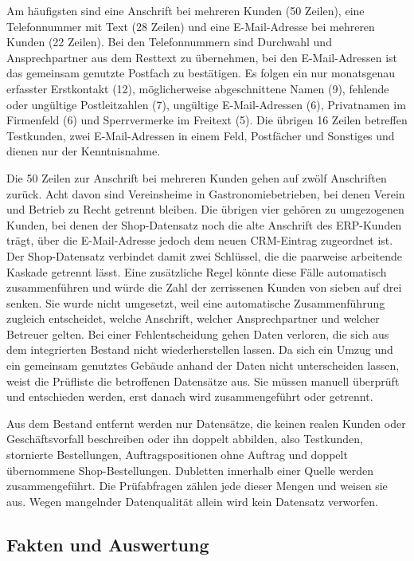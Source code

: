 \documentclass[a4paper,12pt]{article}
\begin{document}
Am häufigsten sind eine Anschrift bei mehreren Kunden (50 Zeilen), eine Telefonnummer mit Text (28 Zeilen) und eine E-Mail-Adresse bei mehreren Kunden (22 Zeilen). Bei den Telefonnummern sind Durchwahl und Ansprechpartner aus dem Resttext zu übernehmen, bei den E-Mail-Adressen ist das gemeinsam genutzte Postfach zu bestätigen. Es folgen ein nur monatsgenau erfasster Erstkontakt (12), möglicherweise abgeschnittene Namen (9), fehlende oder ungültige Postleitzahlen (7), ungültige E-Mail-Adressen (6), Privatnamen im Firmenfeld (6) und Sperrvermerke im Freitext (5). Die übrigen 16 Zeilen betreffen Testkunden, zwei E-Mail-Adressen in einem Feld, Postfächer und Sonstiges und dienen nur der Kenntnisnahme.

Die 50 Zeilen zur Anschrift bei mehreren Kunden gehen auf zwölf Anschriften zurück. Acht davon sind Vereinsheime in Gastronomiebetrieben, bei denen Verein und Betrieb zu Recht getrennt bleiben. Die übrigen vier gehören zu umgezogenen Kunden, bei denen der Shop-Datensatz noch die alte Anschrift des ERP-Kunden trägt, über die E-Mail-Adresse jedoch dem neuen CRM-Eintrag zugeordnet ist. Der Shop-Datensatz verbindet damit zwei Schlüssel, die die paarweise arbeitende Kaskade getrennt lässt. Eine zusätzliche Regel könnte diese Fälle automatisch zusammenführen und würde die Zahl der zerrissenen Kunden von sieben auf drei senken. Sie wurde nicht umgesetzt, weil eine automatische Zusammenführung zugleich entscheidet, welche Anschrift, welcher Ansprechpartner und welcher Betreuer gelten. Bei einer Fehlentscheidung gehen Daten verloren, die sich aus dem integrierten Bestand nicht wiederherstellen lassen. Da sich ein Umzug und ein gemeinsam genutztes Gebäude anhand der Daten nicht unterscheiden lassen, weist die Prüfliste die betroffenen Datensätze aus. Sie müssen manuell überprüft und entschieden werden, erst danach wird zusammengeführt oder getrennt.

Aus dem Bestand entfernt werden nur Datensätze, die keinen realen Kunden oder Geschäftsvorfall beschreiben oder ihn doppelt abbilden, also Testkunden, stornierte Bestellungen, Auftragspositionen ohne Auftrag und doppelt übernommene Shop-Bestellungen. Dubletten innerhalb einer Quelle werden zusammengeführt. Die Prüfabfragen zählen jede dieser Mengen und weisen sie aus. Wegen mangelnder Datenqualität allein wird kein Datensatz verworfen.

\subsection{Fakten und Auswertung}\label{sec:fakten}
\end{document}
